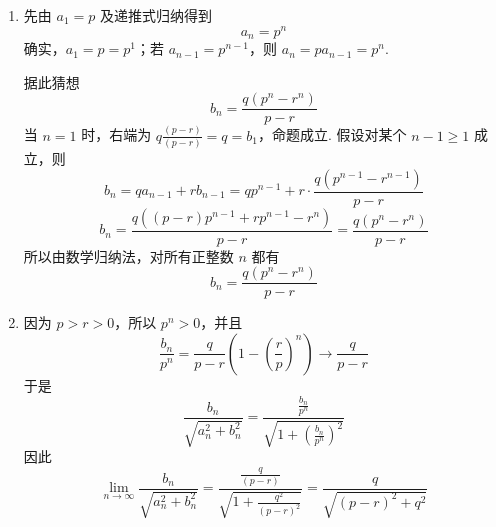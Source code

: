 \documentclass[UTF8,a4paper,oneside,11pt]{ctexbook}
\begin{document}
\begin{solution}
\begin{enumerate}
\item 先由 \(a_1=p\) 及递推式归纳得到
\[
a_n=p^n
\]
确实，\(a_1=p=p^1\)；若 \(a_{n-1}=p^{n-1}\)，则 \(a_n=pa_{n-1}=p^n\).

据此猜想
\[
b_n=\dfrac{q\left(p^n-r^n\right)}{p-r}
\]
当 \(n=1\) 时，右端为 \(q\frac{(p-r)}{(p-r)}=q=b_1\)，命题成立. 假设对某个 \(n-1\geqslant1\) 成立，则
\[
b_n=qa_{n-1}+rb_{n-1}=qp^{n-1}+r\cdot\dfrac{q\left(p^{n-1}-r^{n-1}\right)}{p-r}
\]
\[
b_n=\dfrac{q\left((p-r)p^{n-1}+rp^{n-1}-r^n\right)}{p-r}
=\dfrac{q\left(p^n-r^n\right)}{p-r}
\]
所以由数学归纳法，对所有正整数 \(n\) 都有
\[
b_n=\dfrac{q\left(p^n-r^n\right)}{p-r}
\]

\item 因为 \(p>r>0\)，所以 \(p^n>0\)，并且
\[
\dfrac{b_n}{p^n}=\dfrac{q}{p-r}\left(1-\left(\dfrac{r}{p}\right)^n\right)\longrightarrow\dfrac{q}{p-r}
\]
于是
\[
\frac{b_n}{\sqrt{a_n^2+b_n^2}}
=\frac{\frac{b_n}{p^n}}{\sqrt{1+(\frac{b_n}{p^n})^2}}
\]
因此
\[
\lim_{n\to\infty}\frac{b_n}{\sqrt{a_n^2+b_n^2}}
=\frac{\frac{q}{(p-r)}}{\sqrt{1+\frac{q^2}{(p-r)^2}}}
=\dfrac{q}{\sqrt{(p-r)^2+q^2}}
\]
\end{enumerate}
\end{solution}

\end{document}
